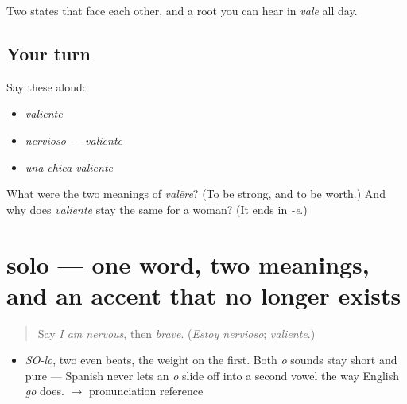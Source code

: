 \begin{grammarlens}[title={What you've built}]
Two states that face each other, and a root you can hear in \emph{vale} all day.
\end{grammarlens}

\subsection*{Your turn}
Say these aloud:

\begin{itemize}
\raggedright
  \item \emph{valiente}
  \item \emph{nervioso — valiente}
  \item \emph{una chica valiente}
\end{itemize}

\begin{tcolorbox}[breakable,colback=teal!4,colframe=teal!35!black,title={Before you move on}]
What were the two meanings of \emph{valēre}? (To be strong, and to be worth.) And why does \emph{valiente} stay the same for a woman? (It ends in \emph{-e}.)
\end{tcolorbox}
\section[solo]{solo — one word, two meanings, and an accent that no longer exists}

\label{lesson:ES-C326-solo}



\begin{quote}
Say \emph{I am nervous}, then \emph{brave}. (\emph{Estoy nervioso}; \emph{valiente}.)
\end{quote}

\begin{sounds}
\begin{itemize}
\raggedright
  \item \emph{SO-lo}, two even beats, the weight on the first. Both \emph{o} sounds stay short and pure — Spanish never lets an \emph{o} slide off into a second vowel the way English \emph{go} does. $\to$ pronunciation reference
\end{itemize}
\end{sounds}

